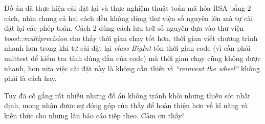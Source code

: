 Đồ án đã thực hiện cài đặt lại và thực nghiệm thuật toán mã hóa RSA bằng 2 cách, nhìn chung cả hai cách đều không dùng thư viện số nguyên lớn mà tự cài đặt lại các phép toán. 
Cách 2 dùng cách lưu trữ số nguyên dựa vào thư viện \textit{boost::multiprecision} cho thấy thời gian chạy tốt hơn, thời gian viết chương trình nhanh hơn trong 
khi tự cài đặt lại \textit{class BigInt} tốn thời gian code (vì cần phải unittest để kiểm tra tính đúng đắn của code) mà thời gian chạy cũng không được nhanh, hơn 
nữa việc cài đặt này là không cần thiết vì \textit{``reinvent the wheel``} không phải là cách hay.

Tuy đã cố gắng rất nhiều nhưng đồ án không tránh khỏi những thiếu sót nhất định, mong nhận được sự đóng góp của thầy để hoàn thiện hơn về kĩ năng và kiến thức 
cho những lần báo cáo tiếp theo. Cảm ơn thầy!
